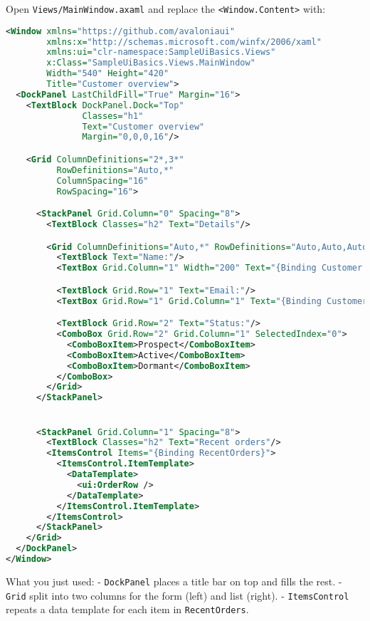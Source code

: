 Open \passthrough{\lstinline!Views/MainWindow.axaml!} and replace the
\passthrough{\lstinline!<Window.Content>!} with:

\begin{lstlisting}[language=XML]
<Window xmlns="https://github.com/avaloniaui"
        xmlns:x="http://schemas.microsoft.com/winfx/2006/xaml"
        xmlns:ui="clr-namespace:SampleUiBasics.Views"
        x:Class="SampleUiBasics.Views.MainWindow"
        Width="540" Height="420"
        Title="Customer overview">
  <DockPanel LastChildFill="True" Margin="16">
    <TextBlock DockPanel.Dock="Top"
               Classes="h1"
               Text="Customer overview"
               Margin="0,0,0,16"/>

    <Grid ColumnDefinitions="2*,3*"
          RowDefinitions="Auto,*"
          ColumnSpacing="16"
          RowSpacing="16">

      <StackPanel Grid.Column="0" Spacing="8">
        <TextBlock Classes="h2" Text="Details"/>

        <Grid ColumnDefinitions="Auto,*" RowDefinitions="Auto,Auto,Auto" RowSpacing="8" ColumnSpacing="12">
          <TextBlock Text="Name:"/>
          <TextBox Grid.Column="1" Width="200" Text="{Binding Customer.Name}"/>

          <TextBlock Grid.Row="1" Text="Email:"/>
          <TextBox Grid.Row="1" Grid.Column="1" Text="{Binding Customer.Email}"/>

          <TextBlock Grid.Row="2" Text="Status:"/>
          <ComboBox Grid.Row="2" Grid.Column="1" SelectedIndex="0">
            <ComboBoxItem>Prospect</ComboBoxItem>
            <ComboBoxItem>Active</ComboBoxItem>
            <ComboBoxItem>Dormant</ComboBoxItem>
          </ComboBox>
        </Grid>
      </StackPanel>


      <StackPanel Grid.Column="1" Spacing="8">
        <TextBlock Classes="h2" Text="Recent orders"/>
        <ItemsControl Items="{Binding RecentOrders}">
          <ItemsControl.ItemTemplate>
            <DataTemplate>
              <ui:OrderRow />
            </DataTemplate>
          </ItemsControl.ItemTemplate>
        </ItemsControl>
      </StackPanel>
    </Grid>
  </DockPanel>
</Window>
\end{lstlisting}

What you just used: - \passthrough{\lstinline!DockPanel!} places a title
bar on top and fills the rest. - \passthrough{\lstinline!Grid!} split
into two columns for the form (left) and list (right). -
\passthrough{\lstinline!ItemsControl!} repeats a data template for each
item in \passthrough{\lstinline!RecentOrders!}.

